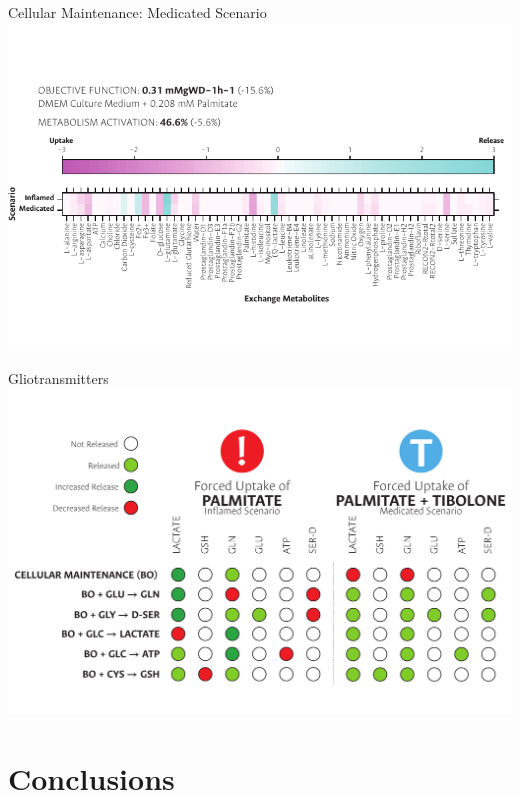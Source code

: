 \documentclass[11pt]{beamer}
\begin{document}
\begin{frame}{Cellular Maintenance: Medicated Scenario}
\includegraphics[width=\textwidth]{M-results}
\end{frame}
\begin{frame}{Gliotransmitters}
\includegraphics[width=\textwidth]{GTt}
\end{frame}
\section{Conclusions}
\begin{frame}
\begin{center}

\end{center}
\end{frame}
\end{document}
